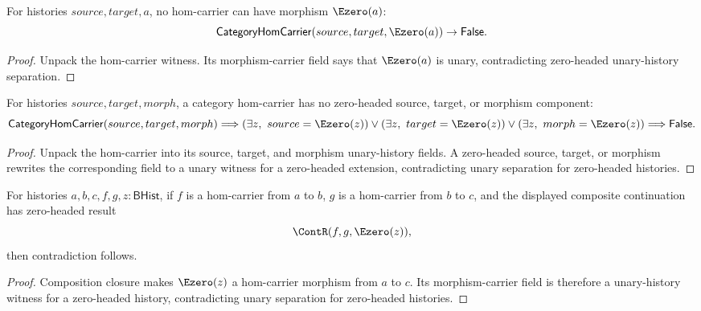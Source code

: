\begin{theorem}
\label{thm:category-hom-carrier-e0-morphism-absurd}
For histories $source,target,a$, no hom-carrier can have morphism $\Ezero(a)$:
$$
\mathsf{CategoryHomCarrier}(source,target,\Ezero(a))\to\mathsf{False}.
$$
\end{theorem}
\begin{proof}
Unpack the hom-carrier witness. Its morphism-carrier field says that
$\Ezero(a)$ is unary, contradicting zero-headed unary-history separation.
\end{proof}

\begin{theorem}
\label{thm:category-hom-carrier-zero-headed-component-absurd}
For histories $source,target,morph$, a category hom-carrier has no
zero-headed source, target, or morphism component:
$$
\mathsf{CategoryHomCarrier}(source,target,morph)
\Longrightarrow
\left(
\exists z,\ source=\Ezero(z)
\right)
\lor
\left(
\exists z,\ target=\Ezero(z)
\right)
\lor
\left(
\exists z,\ morph=\Ezero(z)
\right)
\Longrightarrow
\mathsf{False}.
$$
\end{theorem}
\begin{proof}
Unpack the hom-carrier into its source, target, and morphism unary-history
fields. A zero-headed source, target, or morphism rewrites the corresponding
field to a unary witness for a zero-headed extension, contradicting unary
separation for zero-headed histories.
\end{proof}

\begin{theorem}
\label{thm:category-hom-carrier-comp-zero-result-absurd}
For histories $a,b,c,f,g,z:\mathsf{BHist}$, if $f$ is a hom-carrier from $a$
to $b$, $g$ is a hom-carrier from $b$ to $c$, and the displayed composite
continuation has zero-headed result
$$
\ContR(f,g,\Ezero(z)),
$$
then contradiction follows.
\end{theorem}
\begin{proof}
Composition closure makes $\Ezero(z)$ a hom-carrier morphism from $a$ to $c$.
Its morphism-carrier field is therefore a unary-history witness for a
zero-headed history, contradicting unary separation for zero-headed histories.
\end{proof}

